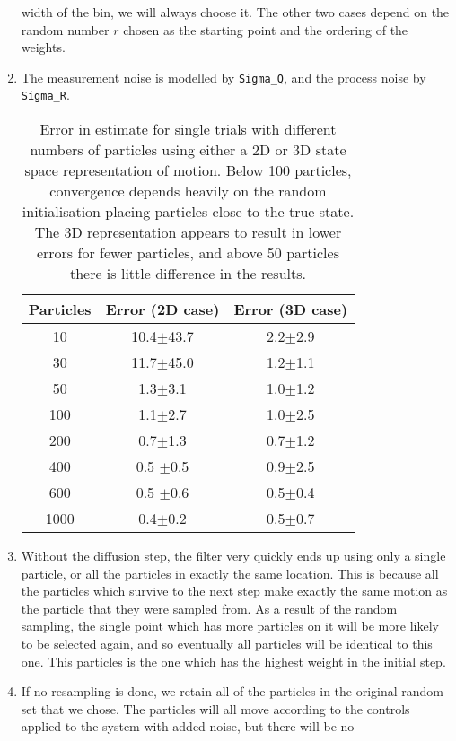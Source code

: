 \documentclass[a4paper,12pt]{article}
\begin{document}
\begin{enumerate}
  width of the bin, we will always choose it. The other two cases depend on the
  random number $r$ chosen as the starting point and the ordering of the
  weights.
\item The measurement noise is modelled by \texttt{Sigma\_Q}, and the process
  noise by \texttt{Sigma\_R}.
  \begin{table}
    \centering
    \begin{tabular}{c|cc}
      Particles & Error (2D case)     & Error (3D case)   \\\hline
      10 & 10.4$\pm$43.7 & 2.2$\pm$2.9 \\
      30 & 11.7$\pm$45.0 & 1.2$\pm$1.1 \\
      50 & 1.3$\pm$3.1   & 1.0$\pm$1.2 \\
      100 & 1.1$\pm$2.7   & 1.0$\pm$2.5 \\
      200 & 0.7$\pm$1.3   & 0.7$\pm$1.2 \\
      400 & 0.5 $\pm$0.5  & 0.9$\pm$2.5 \\
      600 & 0.5 $\pm$0.6  & 0.5$\pm$0.4 \\
      1000 & 0.4$\pm$0.2   & 0.5$\pm$0.7 \\
    \end{tabular}
    \caption{Error in estimate for single trials with different numbers of particles using either a 2D or 3D
      state space representation of motion. Below 100 particles, convergence
      depends heavily on the random initialisation placing particles close to
      the true state. The 3D representation appears to result in lower errors
      for fewer particles, and above 50 particles there is little difference in
      the results.}
    \label{tab:2drep}
  \end{table}
\item Without the diffusion step, the filter very quickly ends up using only a
  single particle, or all the particles in exactly the same location. This is
  because all the particles which survive to the next step make exactly the same
  motion as the particle that they were sampled from. As a result of the random
  sampling, the single point which has more particles on it will be more likely
  to be selected again, and so eventually all particles will be identical to
  this one. This particles is the one which has the highest weight in the
  initial step.
\item If no resampling is done, we retain all of the particles in the original
  random set that we chose. The particles will all move according to the
  controls applied to the system with added noise, but there will be no

\end{enumerate}
\end{document}
